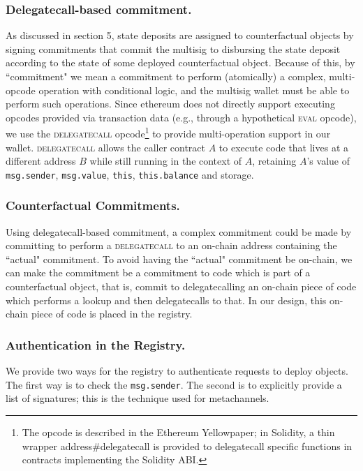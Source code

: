 \documentclass[prb,floatfix,reprint,nofootinbib,amsmath,amssymb,epsfig,pre,floats,letterpaper,groupedaffiliation,tightenlines,allcolors=blue,11pt]{revtex4}
\theoremstyle{definition}
\theoremstyle{definition}
\theoremstyle{definition}
\begin{document}
\subsubsection{Delegatecall-based commitment.} As discussed in section 5, state deposits are assigned to counterfactual objects by signing commitments that commit the multisig to disbursing the state deposit according to the state of some deployed counterfactual object. Because of this, by ``commitment" we mean a commitment to perform (atomically) a complex, multi-opcode operation with conditional logic, and the multisig wallet must be able to perform such operations. Since ethereum does not directly support executing opcodes provided via transaction data (e.g., through a hypothetical \textsc{eval} opcode), we use the \textsc{delegatecall} opcode\footnote{The opcode is described in the Ethereum Yellowpaper\cite{Wood_2017}; in Solidity, a thin wrapper \textsf{address\#delegatecall} is provided\cite{Solidity_2018} to delegatecall specific functions in contracts implementing the Solidity ABI.} to provide multi-operation support in our wallet. \textsc{delegatecall} allows the caller contract $A$ to execute code that lives at a different address $B$ while still running in the context of $A$, retaining $A$'s value of \texttt{msg.sender}, \texttt{msg.value}, \texttt{this}, \texttt{this.balance} and storage.

\subsubsection{Counterfactual Commitments.} Using delegatecall-based commitment, a complex commitment could be made by committing to perform a \textsc{delegatecall} to an on-chain address containing the ``actual" commitment. To avoid having the ``actual" commitment be on-chain, we can make the commitment be a commitment to code which is part of a counterfactual object, that is, commit to delegatecalling an on-chain piece of code which performs a lookup and then delegatecalls to that. In our design, this on-chain piece of code is placed in the registry.

\subsubsection{Authentication in the Registry.} We provide two ways for the registry to authenticate requests to deploy objects. The first way is to check the \texttt{msg.sender}. The second is to explicitly provide a list of signatures; this is the technique used for metachannels.
\end{document}

